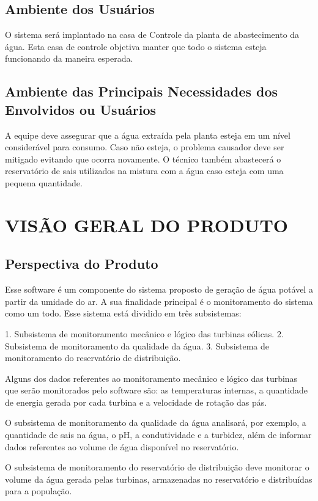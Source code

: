   \subsection{Ambiente dos Usuários}
  O sistema será implantado na casa  de Controle da planta de abastecimento da água. Esta casa de controle objetiva manter que 
  todo o sistema esteja funcionando da maneira esperada.
  
  \subsection{Ambiente das Principais Necessidades dos Envolvidos ou Usuários}
  A equipe deve assegurar que a água extraída pela planta esteja em um nível considerável para consumo. Caso não esteja, o 
  problema causador deve ser mitigado evitando que ocorra novamente. O técnico também abastecerá o reservatório de sais 
  utilizados na mistura com a água caso esteja com uma pequena quantidade.
  
  \section{VISÃO GERAL DO PRODUTO}
  
  \subsection{Perspectiva do Produto}
  Esse software é um componente do sistema proposto de geração de água potável a partir da umidade do ar. A sua finalidade 
  principal é o monitoramento do sistema como um todo. Esse sistema está dividido em três subsistemas: 
  
  1. Subsistema de monitoramento mecânico e lógico das turbinas eólicas.
  2. Subsistema de monitoramento da qualidade da água.
  3. Subsistema de monitoramento do reservatório de distribuição.
  
  Alguns dos dados referentes ao monitoramento mecânico e lógico das turbinas que serão monitorados pelo software são: as temperaturas 
  internas, a quantidade de energia gerada por cada turbina e a velocidade de rotação das pás. 
  
  O subsistema de monitoramento da qualidade da água analisará, por exemplo, a quantidade de sais na água, o pH, a condutividade e a 
  turbidez, além de informar dados referentes ao volume de água disponível no reservatório.
  
  O subsistema de monitoramento do reservatório de distribuição deve monitorar o volume da água gerada pelas turbinas, armazenadas
  no reservatório e distribuídas para a população.
  
